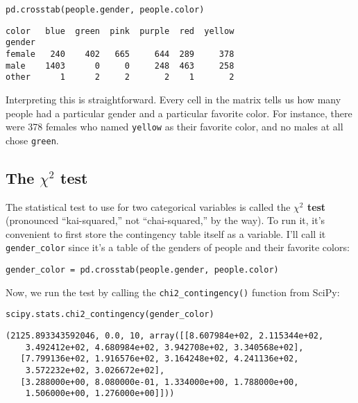 \begin{Verbatim}[fontsize=\small,samepage=true,frame=single,framesep=3mm]
pd.crosstab(people.gender, people.color)
\end{Verbatim}
\vspace{-.2in}

\begin{Verbatim}[fontsize=\small,samepage=true,frame=leftline,framesep=5mm,framerule=1mm]
color   blue  green  pink  purple  red  yellow
gender                                        
female   240    402   665     644  289     378
male    1403      0     0     248  463     258
other      1      2     2       2    1       2
\end{Verbatim}

Interpreting this is straightforward. Every cell in the matrix tells us how
many people had a particular gender and a particular favorite color. For
instance, there were 378 females who named \texttt{yellow} as their favorite
color, and no males at all chose \texttt{green}.


\subsection{The $\chi^2$ test}


The statistical test to use for two categorical variables is called the
\textbf{$\chi^2$ test} (pronounced ``kai-squared,'' not ``chai-squared,'' by
the way). To run it, it's convenient to first store the contingency table
itself as a variable. I'll call it \texttt{gender\_color} since it's a table of
the genders of people and their favorite colors:

\begin{Verbatim}[fontsize=\small,samepage=true,frame=single,framesep=3mm]
gender_color = pd.crosstab(people.gender, people.color)
\end{Verbatim}

Now, we run the test by calling the \texttt{chi2\_contingency()} function from
SciPy:

\begin{Verbatim}[fontsize=\footnotesize,samepage=true,frame=single,framesep=3mm]
scipy.stats.chi2_contingency(gender_color)
\end{Verbatim}
\vspace{-.2in}

\begin{Verbatim}[fontsize=\small,samepage=true,frame=leftline,framesep=5mm,framerule=1mm]
(2125.893343592046, 0.0, 10, array([[8.607984e+02, 2.115344e+02, 
    3.492412e+02, 4.680984e+02, 3.942708e+02, 3.340568e+02],
   [7.799136e+02, 1.916576e+02, 3.164248e+02, 4.241136e+02, 
    3.572232e+02, 3.026672e+02],
   [3.288000e+00, 8.080000e-01, 1.334000e+00, 1.788000e+00, 
    1.506000e+00, 1.276000e+00]]))
\end{Verbatim}

